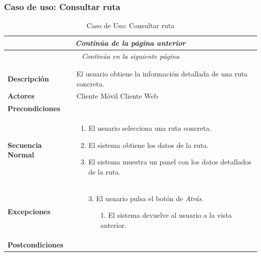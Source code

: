 \newpage
\subsubsection*{Caso de uso: Consultar ruta}
\begin{longtable}{| p{4cm} | p{10cm} |}
\endfirsthead
\multicolumn{2}{c}{\textit{Continúa de la página anterior}}\\[12pt]
\hline
\endhead
\hline
\multicolumn{2}{c}{\textit{Continúa en la siguiente página}} \\
\endfoot
\hline
\caption{Caso de Uso: Consultar ruta}\label{fig:1}\\
\endlastfoot


\hline
\multicolumn{2}{|c|}{\textbf{CU$<$06$>$ - Consultar Ruta}} \\

\hline
\textbf{Descripción} &
El usuario obtiene la información detallada de una ruta concreta.\\

\hline
\textbf{Actores} &
Cliente Móvil\newline
Cliente Web\\

\hline
\textbf{Precondiciones} &
\\

\hline
\textbf{Secuencia Normal} &\mbox{}\par\vspace{-\baselineskip}
\begin{enumerate}[leftmargin=0.7cm, topsep=0.1cm]
\item El usuario selecciona una ruta concreta.
\item El sistema obtiene los datos de la ruta.
\item El sistema muestra un panel con los datos detallados de la ruta.
\end{enumerate}\\

\hline
\textbf{Excepciones} &\mbox{}\par\vspace{-\baselineskip}
\begin{enumerate}[leftmargin=0.9cm, topsep=0.1cm]
\item[3.] El usuario pulsa el botón de \textit{Atrás}.
	\begin{itemize}
	\item[1.] El sistema devuelve al usuario a la vista anterior.
	\end{itemize}
\end{enumerate}
\\

\hline
\textbf{Postcondiciones} & 
\\
\hline
\end{longtable}




